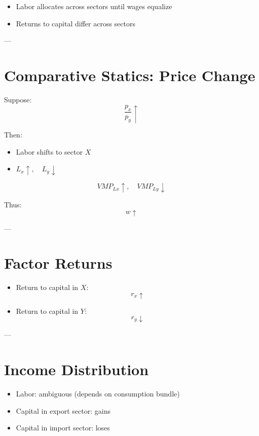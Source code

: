 \begin{itemize}
    \item Labor allocates across sectors until wages equalize
    \item Returns to capital differ across sectors
\end{itemize}

---

\section{Comparative Statics: Price Change}

Suppose:
\[
\frac{p_x}{p_y} \uparrow
\]

Then:

\begin{itemize}
    \item Labor shifts to sector $X$
    \item $L_x \uparrow, \quad L_y \downarrow$
\end{itemize}

\[
VMP_{Lx} \uparrow, \quad VMP_{Ly} \downarrow
\]

Thus:
\[
w \uparrow
\]

---

\section{Factor Returns}

\begin{itemize}
    \item Return to capital in $X$:
    \[
    r_x \uparrow
    \]

    \item Return to capital in $Y$:
    \[
    r_y \downarrow
    \]
\end{itemize}

---

\section{Income Distribution}

\begin{itemize}
    \item Labor: ambiguous (depends on consumption bundle)
    \item Capital in export sector: gains
    \item Capital in import sector: loses
\end{itemize}

